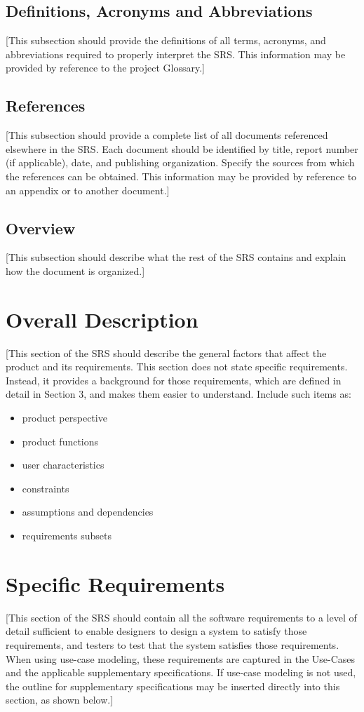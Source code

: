 \documentclass[a4paper,12pt,chapterprefix=false,bibliography=totoc,listof=totoc]{scrreprt}
\begin{document}
\section{Definitions, Acronyms and Abbreviations}
[This subsection should provide the definitions of all terms, acronyms, and abbreviations required to properly interpret the SRS.  This information may be provided by reference to the project Glossary.]

\section{References}
[This subsection should provide a complete list of all documents referenced elsewhere in the SRS.  Each document should be identified by title, report number (if applicable), date, and publishing organization.  Specify the sources from which the references can be obtained. This information may be provided by reference to an appendix or to another document.]

\section{Overview}
[This subsection should describe what the rest of the SRS contains and explain how the document is organized.]

\chapter{Overall Description}
[This section of the SRS should describe the general factors that affect the product and its requirements.  This section does not state specific requirements.  Instead, it provides a background for those requirements, which are defined in detail in Section 3, and makes them easier to understand. Include such items as:
\begin{itemize}
	\item product perspective
	\item product functions
	\item user characteristics
	\item constraints
	\item assumptions and dependencies
	\item requirements subsets
\end{itemize}

\chapter{Specific Requirements}
[This section of the SRS should contain all the software requirements to a level of detail sufficient to enable designers to design a system to satisfy those requirements, and testers to test that the system satisfies those requirements.   When using use-case modeling, these requirements are captured in the Use-Cases and the applicable supplementary specifications.  If use-case modeling is not used, the outline for supplementary specifications may be inserted directly into this section, as shown below.]
\end{document}
